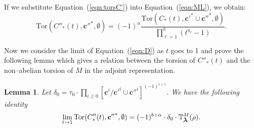 \documentclass[a4paper]{amsart}
\theoremstyle{plain}
\newtheorem{lemma}[theorem]{Lemma}%
\theoremstyle{definition}
\theoremstyle{remark}
\newcommand{\mygeq}{\geqslant}
\newcommand{\smallbm}[1]{\mbox{\small \boldmath $#1$}}
\newcommand{\RTors}[2]{\mathbb{T}^{#1}_{#2}}
\newcommand{\Tor}[3]{\mathrm{Tor} ({#1}, {#2}, {#3})}
\newcommand{\cbasis}[2][c]{\mathbf{#1}^{#2}}
\begin{document}
If we substitute Equation~(\ref{eqn:torsC'}) into Equation~(\ref{eqn:ML}), 
we obtain:
\begin{equation}\label{eqn:D}
  \Tor{C''_*(t)}{\cbasis[c'']{*}}{\emptyset}
  = (-1)^{\alpha}\frac{
    \Tor{C_*(t)}{\cbasis[c']{*} \cup \cbasis[c'']{*}}{\emptyset}
  }{
    \prod_{\ell=1}^b (t^{a_\ell} - 1)
  }.
\end{equation}

Now we consider the limit of Equation~(\ref{eqn:D}) as $t$ goes to 1 and
prove the following lemma which gives a relation between the torsion
of $C''_*(t)$ and the non--abelian torsion of $M$ in the adjoint
representation.
\begin{lemma}\label{lemma:limtors}
  Let $\displaystyle{\delta_0 = {\tau_0} \cdot \prod_{i \mygeq 0} [\cbasis{i} /
    \cbasis[c']{i} \cup \cbasis[c'']{i}]^{(-1)^{i+1}} }$.  We have the following identity
  \begin{equation}\label{eqn:limtors}
    \lim_{t \to 1} \Tor{C''_*(t)}{\cbasis[c'']{*}}{\emptyset} = 
    (-1)^{b+\alpha} \cdot \delta_0 \cdot \RTors{M}{\smallbm{\lambda}}(\rho).
  \end{equation}
\end{lemma}
\end{document}
